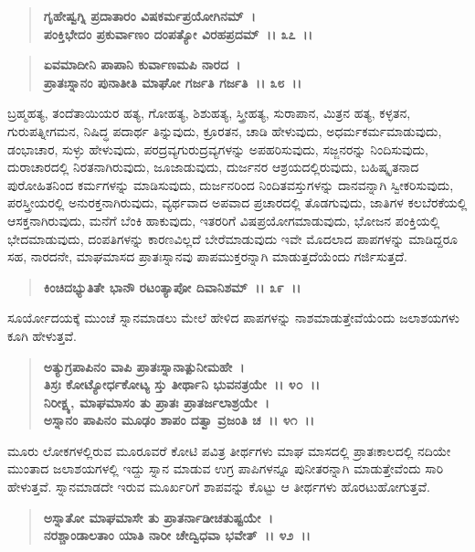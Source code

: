 \begin{verse}
\textbf{ಗೃಹೇಷ್ವಗ್ನಿ ಪ್ರದಾತಾರಂ ವಿಷಕರ್ಮಪ್ರಯೋಗಿನಮ್~।}\\\textbf{ಪಂಕ್ತಿಭೇದಂ ಪ್ರಕುರ್ವಾಣಂ ದಂಪತ್ಯೋ ವಿರಹಪ್ರದಮ್~।। ೩೭~।।}
\end{verse}

\begin{verse}
\textbf{ಏವಮಾದೀನಿ ಪಾಪಾನಿ ಕುರ್ವಾಣಮಪಿ ನಾರದ~।}\\\textbf{ಪ್ರಾತಃಸ್ನಾನಂ ಪುನಾತೀತಿ ಮಾಘೋ ಗರ್ಜತಿ ಗರ್ಜತಿ~।। ೩೮~।।}
\end{verse}

ಬ್ರಹ್ಮಹತ್ಯ, ತಂದೆತಾಯಿಯರ ಹತ್ಯ, ಗೋಹತ್ಯ, ಶಿಶುಹತ್ಯ, ಸ್ತ್ರೀಹತ್ಯ, ಸುರಾಪಾನ, ಮಿತ್ರನ ಹತ್ಯ, ಕಳ್ಳತನ, ಗುರುಪತ್ನೀಗಮನ, ನಿಷಿದ್ಧ ಪದಾರ್ಥ ತಿನ್ನುವುದು, ಕ್ರೂರತನ, ಚಾಡಿ ಹೇಳುವುದು, ಅಧರ್ಮಕರ್ಮಮಾಡುವುದು, ಡಂಭಾಚಾರ, ಸುಳ್ಳು ಹೇಳುವುದು, ಪರದ್ರವ್ಯ\enginline{-}ಗುರುದ್ರವ್ಯಗಳನ್ನು ಅಪಹರಿಸುವುದು, ಸಜ್ಜನರನ್ನು ನಿಂದಿಸುವುದು, ದುರಾಚಾರದಲ್ಲಿ ನಿರತನಾಗಿರುವುದು, ಜೂಜಾಡುವುದು, ದುರ್ಜನರ ಆಶ್ರಯದಲ್ಲಿರುವುದು, ಬಹಿಷ್ಕೃತನಾದ ಪುರೋಹಿತನಿಂದ ಕರ್ಮಗಳನ್ನು ಮಾಡಿಸುವುದು, ದುರ್ಜನರಿಂದ ನಿಂದಿತವಸ್ತುಗಳನ್ನು ದಾನವನ್ನಾಗಿ ಸ್ವೀಕರಿಸುವುದು, ಪರಸ್ತ್ರೀಯರಲ್ಲಿ ಅನುರಕ್ತನಾಗಿರುವುದು, ವ್ಯರ್ಥವಾದ ಅಪವಾದ ಪ್ರಚಾರದಲ್ಲಿ ತೊಡಗುವುದು, ಜಾತಿಗಳ ಕಲಬೆರಕೆಯಲ್ಲಿ ಆಸಕ್ತನಾಗಿರುವುದು, ಮನೆಗೆ ಬೆಂಕಿ ಹಾಕುವುದು, ಇತರರಿಗೆ ವಿಷಪ್ರಯೋಗಮಾಡುವುದು, ಭೋಜನ ಪಂಕ್ತಿಯಲ್ಲಿ ಭೇದಮಾಡುವುದು, ದಂಪತಿಗಳನ್ನು ಕಾರಣವಿಲ್ಲದೆ ಬೇರೆಮಾಡುವುದು ಇವೇ ಮೊದಲಾದ ಪಾಪಗಳನ್ನು ಮಾಡಿದ್ದರೂ ಸಹ, ನಾರದನೇ, ಮಾಘಮಾಸದ ಪ್ರಾತಃಸ್ನಾನವು ಪಾಪಮುಕ್ತರನ್ನಾಗಿ ಮಾಡುತ್ತದೆಯೆಂದು ಗರ್ಜಿಸುತ್ತದೆ.

\begin{verse}
\textbf{ಕಿಂಚಿದಭ್ಯುತಿತೇ ಭಾನೌ ರಟಂತ್ಯಾಪೋ ದಿವಾನಿಶಮ್~।। ೩೯~।।}
\end{verse}

ಸೂರ್ಯೋದಯಕ್ಕೆ ಮುಂಚೆ ಸ್ನಾನಮಾಡಲು ಮೇಲೆ ಹೇಳಿದ ಪಾಪಗಳನ್ನು ನಾಶಮಾಡುತ್ತೇವೆಯೆಂದು ಜಲಾಶಯಗಳು ಕೂಗಿ ಹೇಳುತ್ತವೆ.

\begin{verse}
\textbf{ಅತ್ಯುಗ್ರಪಾಪಿನಂ ವಾಪಿ ಪ್ರಾತಃಸ್ನಾನಾತ್ಪುನೀಮಹೇ~।}\\\textbf{ತಿಸ್ರಃ ಕೋಟ್ಯೋರ್ಧಕೋಟ್ಯ ಸ್ತು ತೀರ್ಥಾನಿ ಭುವನತ್ರಯೇ~।। ೪೦~।।}\\\textbf{ನಿರೀಕ್ಷ್ಯ, ಮಾಘಮಾಸಂ ತು ಪ್ರಾತಃ ಪ್ರಾತರ್ಜಲಾಶ್ರಯೇ~।}\\\textbf{ಅಸ್ನಾನಂ ಪಾಪಿನಂ ಮೂಢಂ ಶಾಪಂ ದತ್ವಾ ವ್ರಜಂತಿ ಚ~।। ೪೧~।।}
\end{verse}

ಮೂರು ಲೋಕಗಳಲ್ಲಿರುವ ಮೂರೂವರೆ ಕೋಟಿ ಪವಿತ್ರ ತೀರ್ಥಗಳು ಮಾಘ ಮಾಸದಲ್ಲಿ ಪ್ರಾತಃಕಾಲದಲ್ಲಿ ನದಿಯೇ ಮುಂತಾದ ಜಲಾಶಯಗಳಲ್ಲಿ ಇದ್ದು ಸ್ನಾನ ಮಾಡುವ ಉಗ್ರ ಪಾಪಿಗಳನ್ನೂ ಪುನೀತರನ್ನಾಗಿ ಮಾಡುತ್ತೇವೆಂದು ಸಾರಿ ಹೇಳುತ್ತವೆ. ಸ್ನಾನಮಾಡದೇ ಇರುವ ಮೂರ್ಖರಿಗೆ ಶಾಪವನ್ನು ಕೊಟ್ಟು ಆ ತೀರ್ಥಗಳು ಹೊರಟುಹೋಗುತ್ತವೆ.

\begin{verse}
\textbf{ಅಸ್ನಾತೋ ಮಾಘಮಾಸೇ ತು ಪ್ರಾತರ್ನಾಡೀಚತುಷ್ಟಯೇ~।}\\\textbf{ನರಶ್ಚಾಂಡಾಲತಾಂ ಯಾತಿ ನಾರೀ ಚೇದ್ವಿಧವಾ ಭವೇತ್~।। ೪೨~।।}
\end{verse}

